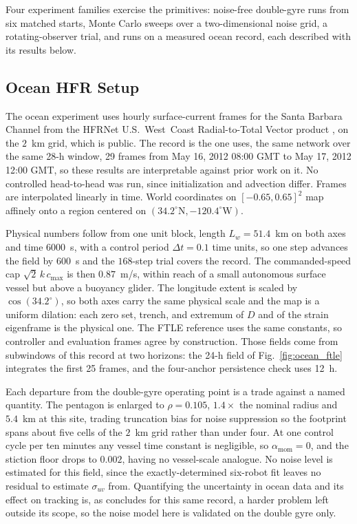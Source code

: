 \documentclass[lettersize,journal]{IEEEtran}
\begin{document}
Four experiment families exercise the primitives: noise-free
double-gyre runs from six matched starts, Monte Carlo sweeps over a
two-dimensional noise grid, a rotating-observer trial, and runs on a
measured ocean record, each described with its results below.

\subsection{Ocean HFR Setup}
\label{sec:ocean_sim}

The ocean experiment uses hourly surface-current frames for the Santa
Barbara Channel from the HFRNet U.S.~West~Coast Radial-to-Total Vector
product \cite{35}, on the $2$~km grid, which is public. The record is the one \cite{26} uses, the same network over the same 28-h window, 29 frames from May 16, 2012 08:00 GMT to May 17, 2012 12:00 GMT, so these results are interpretable against prior work on it. No controlled head-to-head was run, since initialization and advection differ.
Frames are interpolated linearly in time. World
coordinates on $[-0.65, 0.65]^2$ map affinely onto a region centered on
$(34.2^{\circ}\mathrm{N}, -120.4^{\circ}\mathrm{W})$.

Physical numbers follow from one unit block, length $L_w = 51.4$~km on
both axes and time $6000$~s, with a control period $\Delta t = 0.1$
time units, so one step advances the field by $600$~s and the
$168$-step trial covers the record. The commanded-speed cap
$\sqrt{2}\,k\,c_{\max}$ is then $0.87$~m/s, within reach of a small
autonomous surface vessel but above a buoyancy glider. The longitude
extent is
scaled by $\cos(34.2^{\circ})$, so both axes carry the same physical
scale and the map is a uniform dilation: each zero set, trench, and
extremum of $D$ and of the strain eigenframe is the physical one. The
FTLE reference uses the same constants, so controller and evaluation
frames agree by construction. Those fields come from subwindows of this record at two
horizons: the 24-h field of Fig.~\ref{fig:ocean_ftle} integrates the
first 25 frames, and the four-anchor persistence check uses 12~h.

Each departure from the double-gyre operating point is a trade against a
named quantity. The pentagon is
enlarged to $\rho = 0.105$, $1.4\times$ the nominal radius and $5.4$~km
at this site, trading truncation bias for noise suppression so the
footprint spans about five cells of the $2$~km grid rather
than under four. At one control cycle per ten minutes any vessel time
constant is negligible, so $\alpha_{\text{mom}} = 0$, and the stiction
floor drops to $0.002$, having no vessel-scale analogue. No noise level is estimated for this field, since the exactly-determined six-robot fit leaves no residual to estimate $\sigma_{uv}$ from. Quantifying the uncertainty in ocean data and its effect on tracking is, as \cite{26} concludes for this same record, a harder problem left outside its scope, so the noise model here is validated on the double gyre only.
\end{document}
